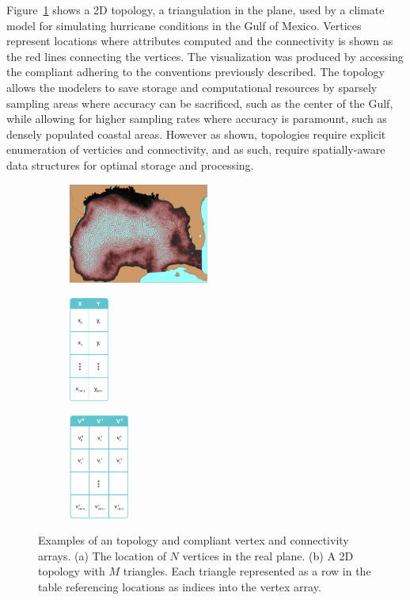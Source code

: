 Figure~\ref{fig:usf_fvcom_ugrid} shows a \ugrid{} 2D topology, a
triangulation in the plane, used by a climate model for simulating
hurricane conditions in the Gulf of Mexico. Vertices represent
locations where attributes computed and the connectivity is shown as
the red lines connecting the vertices. The visualization was produced
by accessing the \cfugrid{} compliant \ncml{} adhering to the
conventions previously described. The \ugrid{} topology allows the
modelers to save storage and computational resources by sparsely
sampling areas where accuracy can be sacrificed, such as the center of
the Gulf, while allowing for higher sampling rates where accuracy is
paramount, such as densely populated coastal areas. However as shown,
\ugrid{} topologies require explicit enumeration of verticies and
connectivity, and as such, require spatially-aware data structures for
optimal storage and processing.

\begin{figure}
  \centering
  \begin{subfigure}[t]{0.33\textwidth}
    \centering
    \includegraphics[height=1.3in]{../figs/USF_FVCOM_Hurricane_Ike_2D_final_run_with_waves_topology.png}
    \caption{}
    \label{fig:usf_fvcom_ugrid}
  \end{subfigure}
  \begin{subfigure}[t]{0.32\textwidth}
    \centering
    \includegraphics[height=1.35in]{../figs/xy_table}
    \caption{}
    \label{fig:xytable}
  \end{subfigure}
  \begin{subfigure}[t]{0.32\textwidth}
    \centering
    \includegraphics[height=1.35in]{../figs/v_table}
    \caption{}
    \label{fig:vtable}
  \end{subfigure}
  \caption{Examples of an \ugrid{} topology and \cfugrid compliant
    vertex and connectivity arrays. (a) The location of $N$
    vertices in the real plane. (b) A 2D topology with
    $M$ triangles. Each triangle represented as a row in the table
    referencing locations as indices into the vertex array.}
\end{figure}
